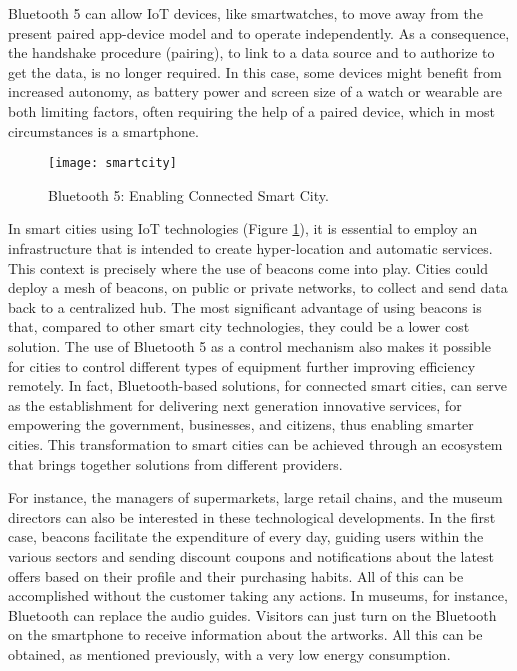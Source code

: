 \documentclass[12pt, draftclsnofoot, onecolumn]{IEEEtran}
\begin{document}
Bluetooth 5 can allow IoT devices, like smartwatches, to move away from the present paired app-device model and to operate independently. As a consequence, the handshake procedure (pairing), to link to a data source and to authorize to get the data, is no longer required. In this case, some devices might benefit from increased autonomy, as battery power and screen size of a watch or wearable are both limiting factors, often requiring the help of a paired device, which in most circumstances is a smartphone.

\begin{figure}
	\centering
	\texttt{[image: smartcity]}
	\caption{Bluetooth 5: Enabling Connected Smart City.}
	\label{fig:smartcity}
\end{figure}

In smart cities using IoT technologies (Figure \ref{fig:smartcity}), it is essential to employ an infrastructure that is intended to create hyper-location and automatic services. This context is precisely where the use of beacons come into play. Cities could deploy a mesh of beacons, on public or private networks, to collect and send data back to a centralized hub. The most significant advantage of using beacons is that, compared to other smart city technologies, they could be a lower cost solution. The use of Bluetooth 5 as a control mechanism also makes it possible for cities to control different types of equipment further improving efficiency remotely. In fact, Bluetooth-based solutions, for connected smart cities, can serve as the establishment for delivering next generation innovative services, for empowering the government, businesses, and citizens, thus enabling smarter cities. This transformation to smart cities can be achieved through an ecosystem that brings together solutions from different providers.

For instance, the managers of supermarkets, large retail chains, and the museum directors can also be interested in these technological developments. In the first case, beacons facilitate the expenditure of every day, guiding users within the various sectors and sending discount coupons and notifications about the latest offers based on their profile and their purchasing habits. All of this can be accomplished without the customer taking any actions. In museums,  for instance, Bluetooth can replace the audio guides. Visitors can just turn on the Bluetooth on the smartphone to receive information about the artworks. All this can be obtained, as mentioned previously, with a very low energy consumption.
\end{document}
